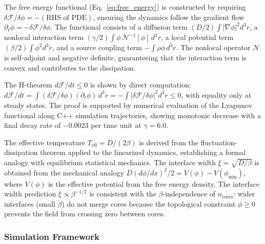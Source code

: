 \documentclass[sn-nature,pdflatex]{sn-jnl}
\begin{document}
The free energy functional (Eq.~\ref{eq:free_energy}) is constructed by requiring $\delta\mathcal{F}/\delta\phi = -(\text{RHS of PDE})$, ensuring the dynamics follow the gradient flow $\partial_t\phi = -\delta\mathcal{F}/\delta\phi$. The functional consists of a diffusion term $(D/2)\int |\nabla\phi|^2 d^3r$, a nonlocal interaction term $(\gamma/2)\int\phi\,\mathcal{N}^{-1}[\phi]\,d^3r$, a local potential term $(\beta/2)\int\phi^2 d^3r$, and a source coupling term $-\int\rho\phi\,d^3r$. The nonlocal operator $\mathcal{N}$ is self-adjoint and negative definite, guaranteeing that the interaction term is convex and contributes to the dissipation.

The H-theorem $d\mathcal{F}/dt \le 0$ is shown by direct computation: $d\mathcal{F}/dt = \int (\delta\mathcal{F}/\delta\phi)(\partial_t\phi)\,d^3r = -\int |\delta\mathcal{F}/\delta\phi|^2 d^3r \le 0$, with equality only at steady states. The proof is supported by numerical evaluation of the Lyapunov functional along C++ simulation trajectories, showing monotonic decrease with a final decay rate of $-0.0023$ per time unit at $\gamma = 6.0$.

The effective temperature $T_{\text{eff}} = D/(2\beta)$ is derived from the fluctuation-dissipation theorem applied to the linearized dynamics, establishing a formal analogy with equilibrium statistical mechanics. The interface width $\xi = \sqrt{D/\beta}$ is obtained from the mechanical analogy $D(d\phi/dx)^2/2 = V(\phi) - V(\phi_{\min})$, where $V(\phi)$ is the effective potential from the free energy density. The interface width prediction $\xi \propto \beta^{-1/2}$ is consistent with the $\beta$-independence of $n_{\text{cores}}$: wider interfaces (small $\beta$) do not merge cores because the topological constraint $\phi \ge 0$ prevents the field from crossing zero between cores.

\subsubsection{Simulation Framework}
\end{document}
